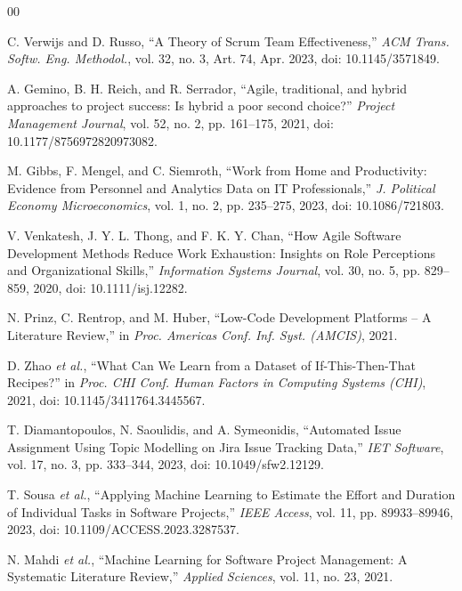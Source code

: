 \documentclass[conference]{IEEEtran}
\begin{document}
\begin{thebibliography}{00}


C. Verwijs and D. Russo, ``A Theory of Scrum Team Effectiveness,''
\textit{ACM Trans. Softw. Eng. Methodol.}, vol. 32, no. 3, Art. 74, Apr. 2023,
doi: 10.1145/3571849.

A. Gemino, B. H. Reich, and R. Serrador, ``Agile, traditional, and hybrid approaches to project success: Is hybrid a poor second choice?''
\textit{Project Management Journal}, vol. 52, no. 2, pp. 161--175, 2021,
doi: 10.1177/8756972820973082.

M. Gibbs, F. Mengel, and C. Siemroth, ``Work from Home and Productivity: Evidence from Personnel and Analytics Data on IT Professionals,''
\textit{J. Political Economy Microeconomics}, vol. 1, no. 2, pp. 235--275, 2023,
doi: 10.1086/721803.

V. Venkatesh, J. Y. L. Thong, and F. K. Y. Chan, ``How Agile Software Development Methods Reduce Work Exhaustion: Insights on Role Perceptions and Organizational Skills,''
\textit{Information Systems Journal}, vol. 30, no. 5, pp. 829--859, 2020,
doi: 10.1111/isj.12282.

N. Prinz, C. Rentrop, and M. Huber, ``Low-Code Development Platforms -- A Literature Review,''
in \textit{Proc. Americas Conf. Inf. Syst. (AMCIS)}, 2021.

D. Zhao \textit{et al.}, ``What Can We Learn from a Dataset of If-This-Then-That Recipes?''
in \textit{Proc. CHI Conf. Human Factors in Computing Systems (CHI)}, 2021,
doi: 10.1145/3411764.3445567.

T. Diamantopoulos, N. Saoulidis, and A. Symeonidis,
``Automated Issue Assignment Using Topic Modelling on Jira Issue Tracking Data,''
\textit{IET Software}, vol. 17, no. 3, pp. 333--344, 2023,
doi: 10.1049/sfw2.12129.

T. Sousa \textit{et al.}, ``Applying Machine Learning to Estimate the Effort and Duration of Individual Tasks in Software Projects,''
\textit{IEEE Access}, vol. 11, pp. 89933--89946, 2023,
doi: 10.1109/ACCESS.2023.3287537.

N. Mahdi \textit{et al.}, ``Machine Learning for Software Project Management: A Systematic Literature Review,''
\textit{Applied Sciences}, vol. 11, no. 23, 2021.


\end{thebibliography}
\end{document}
